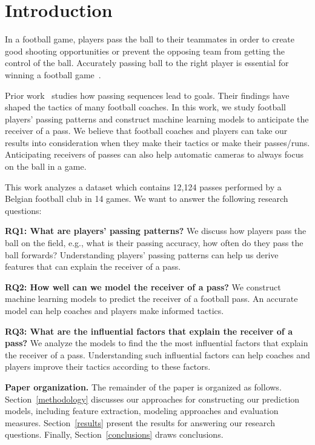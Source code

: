 \section{Introduction} \label{intro}
In a football game, players pass the ball to their teammates in order to create good shooting opportunities or prevent the opposing team from getting the control of the ball.
Accurately passing ball to the right player is essential for winning a football game~\cite{Ali2011Measuring,Hughes2005Analysis}.

Prior work~\cite{reep1968skill,Hughes2005Analysis} studies how passing sequences lead to goals. Their findings have shaped the tactics of many football coaches.
In this work, we study football players' passing patterns and construct machine learning models to anticipate the receiver of a pass.
We believe that football coaches and players can take our results into consideration when they make their tactics or make their passes/runs. 
Anticipating receivers of passes can also help automatic cameras to always focus on the ball in a game.

This work analyzes a dataset which contains 12,124 passes performed by a Belgian football club in 14 games. We want to answer the following research questions: 

\begin{description}
	\item \textbf{RQ1: What are players' passing patterns?}
	We discuss how players pass the ball on the field, e.g., what is their passing accuracy, how often do they pass the ball forwards?
	Understanding players' passing patterns can help us derive features that can explain the receiver of a pass. 
	
	\item \textbf{RQ2: How well can we model the receiver of a pass?}
	We construct machine learning models to predict the receiver of a football pass. 
	An accurate model can help coaches and players make informed tactics.
	
	\item \textbf{RQ3: What are the influential factors that explain the receiver of a pass?}
	We analyze the models to find the the most influential factors that explain the receiver of a pass. Understanding such influential factors can help coaches and players improve their tactics according to these factors.
\end{description}

\textbf{Paper organization.}
The remainder of the paper is organized as follows.
Section~\ref{methodology} discusses our approaches for constructing our prediction models, including feature extraction, modeling approaches and evaluation measures.
Section~\ref{results} present the results for answering our research questions.
Finally, Section~\ref{conclusions} draws conclusions.

